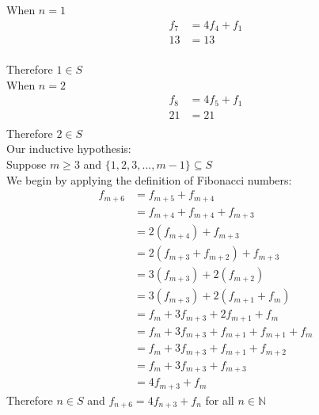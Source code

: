 \documentclass[a4paper,12pt]{article}
\begin{document}
\begin{itemize}
      When $n=1$
      \begin{align*}
        f_7 &= 4f_4 + f_1\\
        13 &= 13\\
      \end{align*}
      
      Therefore $1 \in S$
      \\
      When $n=2$
      \begin{align*}
        f_8 &= 4f_5 + f_1\\
        21 &= 21\\
      \end{align*}
      Therefore $2 \in S$
      \\
      Our inductive hypothesis:
      \\
      Suppose $m \geq 3$ and $\{1,2,3,...,m-1\}\subseteq S$
      \\
      We begin by applying the definition of Fibonacci numbers:
      \begin{align*}
        f_{m+6} &= f_{m+5} + f_{m+4}\\
        &= f_{m+4} + f_{m+4} + f_{m+3}\\
        &= 2(f_{m+4}) + f_{m+3}\\
        &= 2(f_{m+3} + f_{m+2}) + f_{m+3}\\
        &= 3(f_{m+3}) + 2(f_{m+2})\\
        &= 3(f_{m+3}) + 2(f_{m+1} + f_m)\\
        &= f_m + 3f_{m+3} + 2f_{m+1} + f_m\\
        &=f_m + 3f_{m+3} + f_{m+1} + f_{m+1} + f_{m}\\
        &= f_m + 3f_{m+3} + f_{m+1} + f_{m+2}\\
        &= f_m + 3f_{m+3} + f_{m+3}\\
        &= 4f_{m+3} + f_{m}
      \end{align*}
    Therefore $n \in S$ and $f_{n+6}=4f_{n+3} + f_n$ for all $n \in \mathbb{N}$
    \end{itemize} 
\end{document}
